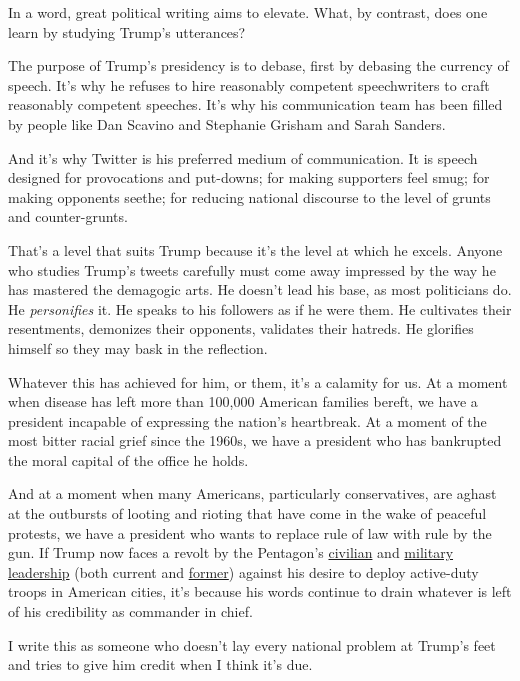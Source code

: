 In a word, great political writing aims to elevate. What, by contrast,
does one learn by studying Trump's utterances?

The purpose of Trump's presidency is to debase, first by debasing the
currency of speech. It's why he refuses to hire reasonably competent
speechwriters to craft reasonably competent speeches. It's why his
communication team has been filled by people like Dan Scavino and
Stephanie Grisham and Sarah Sanders.

And it's why Twitter is his preferred medium of communication. It is
speech designed for provocations and put-downs; for making supporters
feel smug; for making opponents seethe; for reducing national discourse
to the level of grunts and counter-grunts.

That's a level that suits Trump because it's the level at which he
excels. Anyone who studies Trump's tweets carefully must come away
impressed by the way he has mastered the demagogic arts. He doesn't lead
his base, as most politicians do. He \emph{personifies} it. He speaks to
his followers as if he were them. He cultivates their resentments,
demonizes their opponents, validates their hatreds. He glorifies himself
so they may bask in the reflection.

Whatever this has achieved for him, or them, it's a calamity for us. At
a moment when disease has left more than 100,000 American families
bereft, we have a president incapable of expressing the nation's
heartbreak. At a moment of the most bitter racial grief since the 1960s,
we have a president who has bankrupted the moral capital of the office
he holds.

And at a moment when many Americans, particularly conservatives, are
aghast at the outbursts of looting and rioting that have come in the
wake of peaceful protests, we have a president who wants to replace rule
of law with rule by the gun. If Trump now faces a revolt by the
Pentagon's
\href{https://www.nytimes3xbfgragh.onion/2020/06/03/us/politics/esper-milley-trump-protest.html}{civilian}
and
\href{https://int.graylady3jvrrxbe.onion/data/documenthelper/6990-milley-memo/fc4fb1c4459fbdbc87a7/optimized/full.pdf\#page=1}{military
leadership} (both current and
\href{https://www.cnn.com/2020/06/05/politics/john-kelly-agrees-with-jim-mattis-on-trump/index.html}{former})
against his desire to deploy active-duty troops in American cities, it's
because his words continue to drain whatever is left of his credibility
as commander in chief.

I write this as someone who doesn't lay every national problem at
Trump's feet and tries to give him credit when I think it's due.


